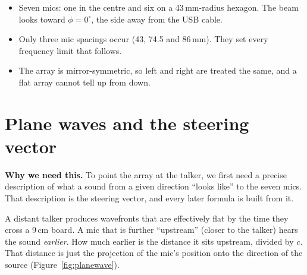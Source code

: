 \documentclass[11pt]{article}
\begin{document}
\begin{takeaways}
\begin{itemize}[nosep]
\item Seven mics: one in the centre and six on a 43\,mm-radius hexagon. The beam looks toward
  $\phi=0^\circ$, the side away from the USB cable.
\item Only three mic spacings occur (43, 74.5 and 86\,mm). They set every frequency limit
  that follows.
\item The array is mirror-symmetric, so left and right are treated the same, and a flat array
  cannot tell up from down.
\end{itemize}
\end{takeaways}

\section{Plane waves and the steering vector}\label{sec:steering}

\noindent\textbf{Why we need this.} To point the array at the talker, we first need a precise
description of what a sound from a given direction ``looks like'' to the seven mics. That
description is the steering vector, and every later formula is built from it.

\begin{intuition}
A distant talker produces wavefronts that are effectively flat by the time they cross a
9\,cm board. A mic that is further ``upstream'' (closer to the talker) hears the sound
\emph{earlier}. How much earlier is the distance it sits upstream, divided by $c$. That
distance is just the projection of the mic's position onto the direction of the source
(Figure~\ref{fig:planewave}).
\end{intuition}
\end{document}
